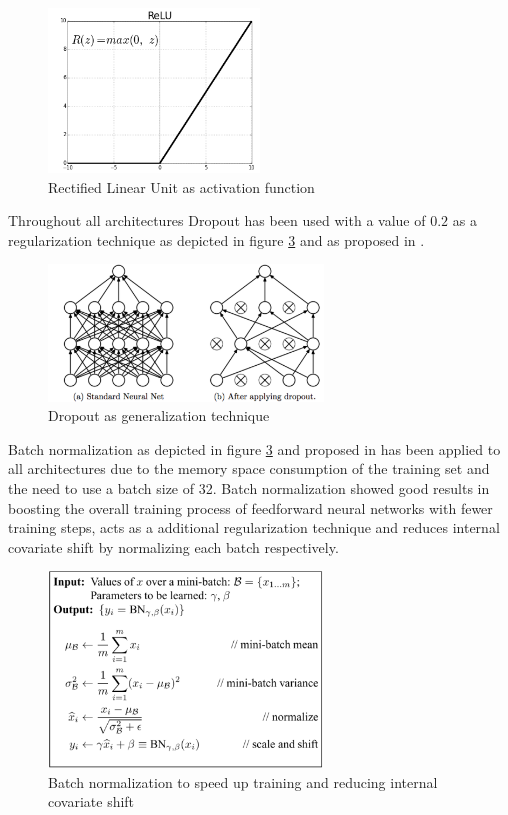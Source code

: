 \documentclass{article}
\theoremstyle{definition}
\theoremstyle{remark}
\begin{document}
\newpage


\begin{figure}[h!]
    \centering
    \includegraphics[width=0.5\textwidth]{img/relu.png}
    \caption{Rectified Linear Unit as activation function}
    \label{fig:relu}
\end{figure}

Throughout all architectures Dropout has been used \cite{srivastava2014dropout} with a value of $0.2$ as a regularization technique as depicted in figure \ref{fig:dropout} and as proposed in \cite{dahl2013improving}.


\begin{figure}[h!]
    \centering
    \includegraphics[width=0.65\textwidth]{img/dropout.png}
    \caption{Dropout as generalization technique}
    \label{fig:dropout}
\end{figure}

Batch normalization as depicted in figure \ref{fig:dropout} and proposed in \cite{ioffe2015batch} has been applied to all architectures due to the memory space consumption of the training set and the need to use a batch size of 32. Batch normalization showed good results in boosting the overall training process of feedforward neural networks with fewer training steps, acts as a additional regularization technique and reduces internal covariate shift by normalizing each batch respectively. 


\begin{figure}[h!]
    \centering
    \includegraphics[width=0.65\textwidth]{img/bn.png}
    \caption{Batch normalization to speed up training and reducing internal covariate shift}
    \label{fig:dropout}
\end{figure}
\end{document}
